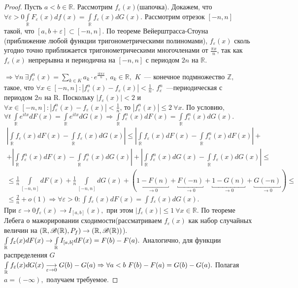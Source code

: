 	\begin{proof}
		Пусть \(a < b \in \mathbb{R}\). Рассмотрим \(f_\varepsilon(x)\)(шапочка). Докажем, что \(\forall \varepsilon > 0 \int\limits_{\mathbb{R}} F_\varepsilon(x) df(x) = \int\limits_\mathbb{R}f_\varepsilon(x)dG(x).\) Рассмотрим отрезок \([-n, n]\) такой, что \([a, b + \varepsilon] \subset [-n, n].\) По теореме Вейерштрасса-Стоуна (приближение любой функции тригонометрическими полиномами), \(f_\varepsilon(x)\) сколь угодно точно приближается тригонометрическими многочленами от \(\frac{\pi x}{n}\), так как \(f_\varepsilon(x)\) непрерывна и периодична на \([-n, n]\) с периодом \(2n\) на \(\mathbb{R}\).

		\noindent \(\Rightarrow \forall n ~ \exists f_\varepsilon^n(x) = \sum\limits_{k \in K} a_k\cdot e^{\frac{ik\pi x}{n}}, ~a_k \in \mathbb{R},\) \(K\)~--- конечное подмножество \(\mathbb{Z},\) такое, что \(\forall x \in [-n, n]: |f_\varepsilon^n(x) - f_\varepsilon(x)| < \frac{1}{n}.\) \(f_\varepsilon^n\)~---периодическая с периодом \(2n\) на \(\mathrm{R}\). Поскольку \(|f_\varepsilon(x)| < 2\) и \(\forall x \in [-n, n]: |f_\varepsilon^n(x) - f_\varepsilon(x)| < \frac{1}{n}\), то \(|f_\varepsilon^n(x)| \leqslant 2 ~ \forall x.\) По условию, \(\forall t~\int\limits_\mathbb{R} e^{itx}dF(x) = \int\limits_\mathbb{R} e^{itx}dG(x) \Rightarrow \int\limits_\mathbb{R} f_\varepsilon^n(x)dF(x) = \int\limits_\mathbb{R} f_\varepsilon^n(x)dG(x).\)
		\begin{gather*}
			\left|\int\limits_\mathbb{R} f_\varepsilon(x) dF(x) - \int\limits_\mathbb{R} f_\varepsilon(x)dG(x)\right| \leqslant \left|\int\limits_\mathbb{R} f_\varepsilon(x) dF(x) - \int\limits_\mathbb{R} f_\varepsilon^n(x) dF(x)\right| +\\
			+  \left|\int\limits_\mathbb{R} f_\varepsilon^n(x) dF(x) - \int\limits_\mathbb{R} f_\varepsilon^n(x) dG(x)\right| + \left|\int\limits_\mathbb{R} f_\varepsilon^n(x) dG(x) - \int\limits_\mathbb{R} f_\varepsilon(x) dG(x)\right| \leqslant\\
			\leqslant \frac{1}{n} \int\limits_{[-n,n]}dF(x) + \frac{1}{n} \int\limits_{[-n,n]}dG(x) +(\underbracket{1 - F(n)}_{\to 0} + \underbracket{F(-n)}_{\to 0} + \underbracket{1 - G(n)}_{\to 0} + \underbracket{G(-n)}_{\to 0}) \leqslant\\
			\leqslant \frac{2}{n} + o(1) \Rightarrow \forall \varepsilon> 0: \int f_\varepsilon(x) dF(x) = \int f_\varepsilon(x)dG(x).
		\end{gather*}
		При \(\varepsilon \to 0 f_\varepsilon(x) \to I_{[a,b]}(x),\) при этом \(|f_\varepsilon(x)| \leqslant 1~ \forall x \in \mathbb{R}.\) По теореме Лебега о мажорировании сходимости(рассматриваем \(f_\varepsilon(x)\) как набор случайных величин на \((\mathbb{R}, \mathscr{B}(\mathbb{R}), P_f) \to (\mathbb{R}, \mathscr{B}(\mathbb{R}))\)).
		\(\int\limits_{\mathbb{R}} f_\varepsilon(x)dF(x) \to \int\limits_{\mathbb{R}} I_{[a,b]}dF(x) = F(b) - F(a).\)
		Аналогично, для функции распределения \(G\) \(\int\limits_{\mathbb{R}} f_\varepsilon(x)dG(x) \underset{\varepsilon \to 0}{\longrightarrow} G(b) - G(a) \Rightarrow \forall a < b ~ F(b) - F(a) = G(b) - G(a).\)  Полагая \(a = (-\infty), \) получаем требуемое.
	\end{proof}


